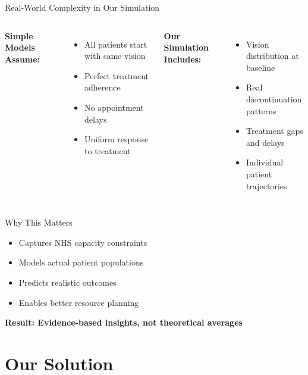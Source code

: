 \documentclass[10pt,aspectratio=169]{beamer}
\begin{document}
\begin{frame}{Real-World Complexity in Our Simulation}
\begin{alertblock}{}
\begin{columns}[T]
\textbf{Simple Models Assume:}
\begin{itemize}
    \item All patients start with same vision
    \item Perfect treatment adherence
    \item No appointment delays
    \item Uniform response to treatment
\end{itemize}

\textbf{Our Simulation Includes:}
\begin{itemize}
    \item \alert{Vision distribution at baseline}
    \item \alert{Real discontinuation patterns}
    \item \alert{Treatment gaps and delays}
    \item Individual patient trajectories
\end{itemize}
\end{columns}
\end{alertblock}

\begin{block}{Why This Matters}
\begin{itemize}
    \item Captures NHS capacity constraints
    \item Models actual patient populations
    \item Predicts realistic outcomes
    \item Enables better resource planning
\end{itemize}
\end{block}

\centering
\textbf{Result: Evidence-based insights, not theoretical averages}
\end{frame}

\section{Our Solution}
\end{document}
